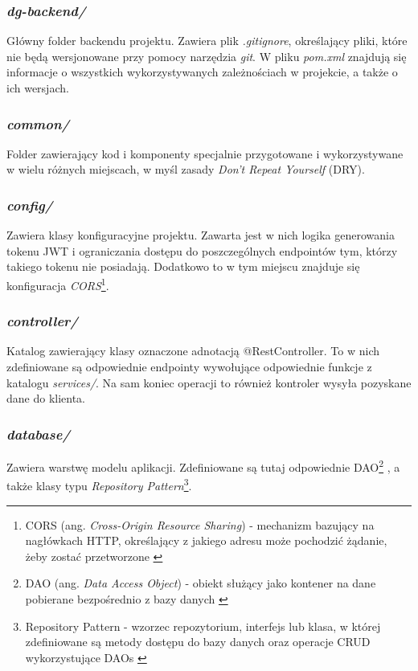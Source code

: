 \documentclass[11pt,a4paper]{article}
\begin{document}

\subsubsection{\textsl{dg-backend/}}
Główny folder backendu projektu. Zawiera plik \textsl{.gitignore}, określający pliki, które nie będą wersjonowane przy pomocy narzędzia \textsl{git}. W pliku \textsl{pom.xml} znajdują się informacje o wszystkich wykorzystywanych zależnościach w projekcie, a także o ich wersjach.

\subsubsection{\textsl{common/}}
Folder zawierający kod i komponenty specjalnie przygotowane i wykorzystywane w wielu różnych miejscach, w myśl zasady \textsl{Don't Repeat Yourself} (DRY).

\subsubsection{\textsl{config/}}
Zawiera klasy konfiguracyjne projektu. Zawarta jest w nich logika generowania tokenu JWT i ograniczania dostępu do poszczególnych endpointów tym, którzy takiego tokenu nie posiadają. Dodatkowo to w tym miejscu znajduje się konfiguracja \textsl{CORS}\footnote{CORS (ang. \textsl{Cross-Origin Resource Sharing}) - mechanizm bazujący na nagłówkach HTTP, określający z jakiego adresu może pochodzić żądanie, żeby zostać przetworzone \cite{cors}}.

\subsubsection{\textsl{controller/}}
Katalog zawierający klasy oznaczone adnotacją \textcolor{keywordColour}{@RestController}. To w nich zdefiniowane są odpowiednie endpointy wywołujące odpowiednie funkcje z katalogu \textsl{services/}. Na sam koniec operacji to również kontroler wysyła pozyskane dane do klienta.

\subsubsection{\textsl{database/}}
Zawiera warstwę modelu aplikacji. Zdefiniowane są tutaj odpowiednie DAO\footnote{DAO (ang. \textsl{Data Access Object}) - obiekt służący jako kontener na dane pobierane bezpośrednio z bazy danych \cite{dao}}
, a także klasy typu \textsl{Repository Pattern}\footnote{Repository Pattern - wzorzec repozytorium, interfejs lub klasa, w której zdefiniowane są metody dostępu do bazy danych oraz operacje CRUD wykorzystujące DAOs \cite{repository-pattern}}.
\end{document}
